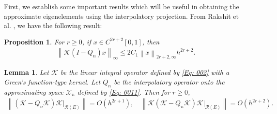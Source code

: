 \documentclass[pdflatex, sn-mathphys-num]{sn-jnl}%
\newcommand{\norm}[1]{\left\lVert #1\right\rVert}
\theoremstyle{thmstyleone}%
\newtheorem{lemma}[theorem]{Lemma}
\newtheorem{proposition}[theorem]{Proposition}
\theoremstyle{thmstyletwo}%
\theoremstyle{thmstylethree}%
\begin{document}
First, we establish some important results which will be useful in obtaining the approximate eigenelements using the interpolatory projection. From Rakshit et al. \cite[Proposition 1]{GR-SKS-ASR}, we have the following result:
\begin{proposition} \label{pro2}
	For $r \geq 0$, if $x \in C^{2r+2}[0,1]$, then
	\begin{eqnarray*}
		\norm{\mathcal{K}(I-Q_n)x }_\infty \leq2C_1 \norm{x}_{2r+2, \infty} h^{2r + 2}.
	\end{eqnarray*}
\end{proposition}
\begin{lemma} \label{lem3}
	Let $ \mathcal{K}$ be the linear integral operator defined by \eqref{Eq: 002} with a Green's function-type kernel. Let $Q_n$ be the interpolatory operator onto the approximating space $\mathcal{X}_n$ defined by \eqref{Eq: 0011}. Then for $r \geq 0$,
	\begin{eqnarray*} 
		\norm{(\mathcal{K} - Q_n \mathcal{K}) \mathcal{K} |_{\mathcal{R}(E)} } = O\left(h^{2r +1}\right), \quad 	\norm{ \mathcal{K} (\mathcal{K} - Q_n \mathcal{K}) \mathcal{K} |_{\mathcal{R}(E)} } = O\left(h^{2r +2}\right).
	\end{eqnarray*}
\end{lemma}
\end{document}

